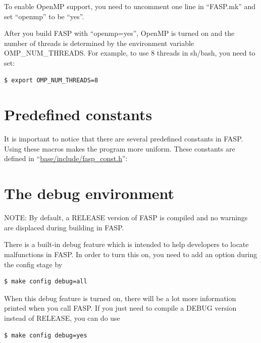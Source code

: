 \documentclass[11pt]{memoir}
\begin{document}
To enable OpenMP support, you need to uncomment one line in ``FASP.mk'' and set ``openmp'' to be ``yes''.


After you build FASP with ``openmp=yes'', OpenMP is turned on and the number of threads is determined by the environment variable OMP\_NUM\_THREADS. For example, to use 8 threads in {\color{red} sh/bash}, you need to set:
\begin{lstlisting}[numbers=none]
$ export OMP_NUM_THREADS=8
\end{lstlisting}

\section{Predefined constants}\label{sec:const}

It is important to notice that there are several predefined constants in FASP. Using these macros makes the program more uniform. These constants are defined in ``\url{base/include/fasp\_const.h}'':
%


\section{The debug environment}\label{sec:debug}

\begin{snugshade}\noindent
NOTE: By default, a RELEASE version of FASP is compiled and no warnings are displaced during building in FASP.
\end{snugshade}
%
There is a built-in debug feature which is intended to help developers to locate malfunctions in FASP. In order to turn this on, you need to add an option during the config stage by
%
\begin{lstlisting}[numbers=none]
$ make config debug=all
\end{lstlisting}
%
When this debug feature is turned on, there will be a lot more information printed when you call FASP. If you just need to compile a DEBUG version instead of RELEASE, you can do use
%
\begin{lstlisting}[numbers=none]
$ make config debug=yes
\end{lstlisting}
%

\end{document}
